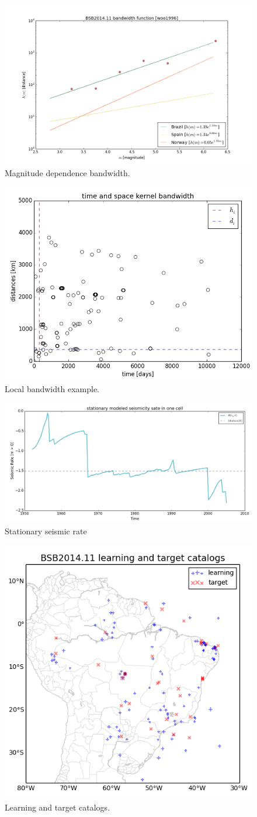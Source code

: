 \documentclass[draft, grl]{agutex}
\begin{document}


\begin{figure}
	\includegraphics[width=0.4\linewidth]{z_img_woo_bandwidth}
	\caption{Magnitude dependence bandwidth.}
	\label{fig_woo_bandwidth}
\end{figure}





\begin{figure}
	\includegraphics[width=0.4\linewidth]{z_img_helmstetter_hidi}
	\caption{Local bandwidth example.}
	\label{fig_helmstetter_hidi}
\end{figure}




\begin{figure}
	\includegraphics[width=0.4\linewidth]{z_img_helmstetter_stationary_a}
	\caption{Stationary seismic rate}
	\label{fig_helmstetter_stationary_rate}
\end{figure}


\begin{figure}
	\includegraphics[width=0.4\linewidth]{z_img_helmstetter_catalogues}
	\caption{Learning and target catalogs.}
	\label{fig_helmstetter_catalogues}
\end{figure}
\end{document}
